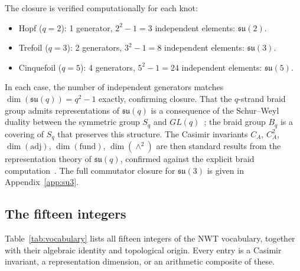 \documentclass[11pt]{article}
\newcommand{\su}{\mathfrak{su}}
\newcommand{\CA}{C_A}
\begin{document}
The closure is verified computationally for each knot:
\begin{itemize}\setlength\itemsep{0pt}
  \item Hopf ($q = 2$): 1 generator,
    $2^2 - 1 = 3$ independent elements: $\su(2)$.
  \item Trefoil ($q = 3$): 2 generators,
    $3^2 - 1 = 8$ independent elements: $\su(3)$.
  \item Cinquefoil ($q = 5$): 4 generators,
    $5^2 - 1 = 24$ independent elements: $\su(5)$.
\end{itemize}
In each case, the number of independent generators matches
$\dim(\su(q)) = q^2 - 1$ exactly, confirming closure.  That the
$q$-strand braid group admits representations of $\su(q)$ is a
consequence of the Schur--Weyl duality between the symmetric
group $S_q$ and $GL(q)$~\cite{FultonHarris}; the braid group
$B_q$ is a covering of $S_q$ that preserves this structure.
The Casimir invariants $\CA$, $\CA^2$,
$\dim(\mathrm{adj})$, $\dim(\mathrm{fund})$,
$\dim(\wedge^2)$ are then standard results from the representation
theory of $\su(q)$, confirmed against the explicit braid
computation~\cite{public-repo}.  The full commutator closure
for $\su(3)$ is given in Appendix~\ref{app:su3}.

\subsection{The fifteen integers}

Table~\ref{tab:vocabulary} lists all fifteen integers of the NWT
vocabulary, together with their algebraic identity and topological
origin.  Every entry is a Casimir invariant, a representation
dimension, or an arithmetic composite of these.
\end{document}
